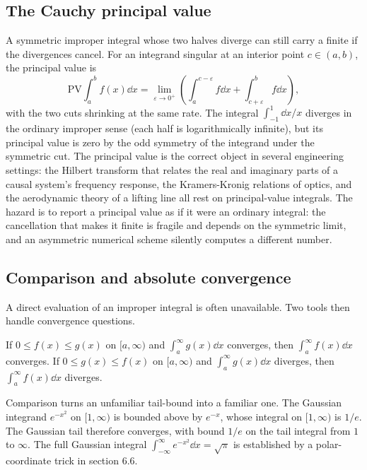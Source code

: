\subsection{The Cauchy principal value}

A symmetric improper integral whose two halves diverge can still
carry a finite  if the divergences cancel.
For an integrand singular at an interior point $c \in (a, b)$, the
principal value is
\[
\mathrm{PV}\!\int_{a}^{b} f(x)\dd x = \lim_{\varepsilon \to 0^{+}}
\left(\int_{a}^{c - \varepsilon} f\dd x + \int_{c + \varepsilon}^{b}
f\dd x\right),
\]
with the two cuts shrinking at the same rate. The integral
$\int_{-1}^{1}\dd x/x$ diverges in the ordinary improper sense
(each half is logarithmically infinite), but its principal value is
zero by the odd symmetry of the integrand under the symmetric cut.
The principal value is the correct object in several engineering
settings: the Hilbert transform that relates the real and imaginary
parts of a causal system's frequency response, the Kramers-Kronig
relations of optics, and the aerodynamic theory of a lifting line
all rest on principal-value integrals. The hazard is to report a
principal value as if it were an ordinary integral: the cancellation
that makes it finite is fragile and depends on the symmetric limit,
and an asymmetric numerical scheme silently computes a different
number.

\subsection{Comparison and absolute convergence}

A direct evaluation of an improper integral is often unavailable.
Two tools then handle convergence questions.

\begin{principle}
If $0 \leq f(x) \leq g(x)$ on $[a, \infty)$ and
$\int_{a}^{\infty} g(x) \dd x$ converges, then
$\int_{a}^{\infty} f(x) \dd x$ converges. If
$0 \leq g(x) \leq f(x)$ on $[a, \infty)$ and
$\int_{a}^{\infty} g(x) \dd x$ diverges, then
$\int_{a}^{\infty} f(x) \dd x$ diverges.
\end{principle}

Comparison turns an unfamiliar tail-bound into a familiar one. The
Gaussian integrand $e^{-x^{2}}$ on $[1, \infty)$ is bounded above
by $e^{-x}$, whose integral on $[1, \infty)$ is $1/e$. The Gaussian
tail therefore converges, with bound $1/e$ on the tail integral
from $1$ to $\infty$. The full Gaussian integral $\int_{-\infty}^{\infty}
e^{-x^{2}} \dd x = \sqrt{\pi}$ is established by a polar-coordinate
trick in section 6.6.

